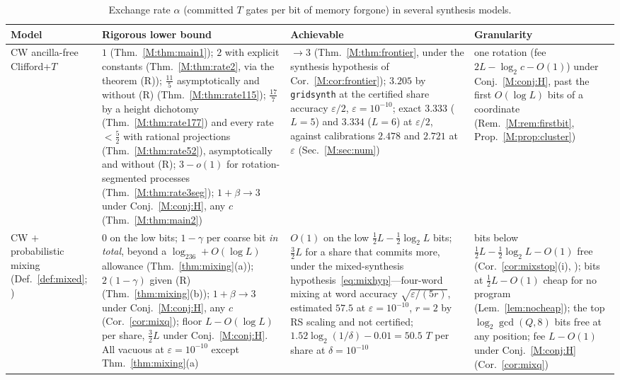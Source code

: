 \documentclass[aps,prx,twocolumn,superscriptaddress,nofootinbib,longbibliography]{revtex4-2}
\theoremstyle{plain}
\theoremstyle{definition}
\theoremstyle{remark}
\begin{document}
\begin{table}[t]
\centering\small
\caption{Exchange rate $\alpha$ (committed $T$ gates per bit of memory forgone) in several synthesis models.}
\label{tab:models}
\begin{tabular}{@{}p{3.6cm} p{5.2cm} p{4.6cm} p{3.4cm}@{}}
\toprule
\raggedright Model & \raggedright Rigorous lower bound & \raggedright Achievable & \raggedright Granularity\tabularnewline
\midrule
\raggedright CW ancilla-free Clifford+$T$ & \raggedright $1$ (Thm.~\ref{M:thm:main1}); $2$ with explicit constants (Thm.~\ref{M:thm:rate2}, via the theorem (R)); $\tfrac{11}5$ asymptotically and without (R) (Thm.~\ref{M:thm:rate115}); $\tfrac{17}7$ by a height dichotomy (Thm.~\ref{M:thm:rate177}) and every rate $<\tfrac52$ with rational projections (Thm.~\ref{M:thm:rate52}), asymptotically and without (R); $3-o(1)$ for rotation-segmented processes (Thm.~\ref{M:thm:rate3seg}); $1+\beta\to3$ under Conj.~\ref{M:conj:H}, any $c$ (Thm.~\ref{M:thm:main2}) & \raggedright $\to3$ (Thm.~\ref{M:thm:frontier}, under the synthesis hypothesis of Cor.~\ref{M:cor:frontier}); $3.205$ by \texttt{gridsynth} at the certified share accuracy $\varepsilon/2$, $\varepsilon=10^{-10}$; exact $3.333$ ($L=5$) and $3.334$ ($L=6$) at $\varepsilon/2$, against calibrations $2.478$ and $2.721$ at $\varepsilon$ (Sec.~\ref{M:sec:num}) & \raggedright one rotation (fee $2L-\log_2c-O(1)$) under Conj.~\ref{M:conj:H}, past the first $O(\log L)$ bits of a coordinate (Rem.~\ref{M:rem:firstbit}, Prop.~\ref{M:prop:cluster})\tabularnewline
\raggedright CW $+$ probabilistic mixing (Def.~\ref{def:mixed}; \cite{Campbell17,Hastings17,KLMPP,Bothe}) & \raggedright $0$ on the low bits; $1-\gamma$ per coarse bit \emph{in total}, beyond a $\log_236+O(\log L)$ allowance (Thm.~\ref{thm:mixing}(a)); $2(1-\gamma)$ given (R) (Thm.~\ref{thm:mixing}(b)); $1+\beta\to3$ under Conj.~\ref{M:conj:H}, any $c$ (Cor.~\ref{cor:mixq}); floor $L-O(\log L)$ per share, $\tfrac32L$ under Conj.~\ref{M:conj:H}. All vacuous at $\varepsilon=10^{-10}$ except Thm.~\ref{thm:mixing}(a) & \raggedright $O(1)$ on the low $\tfrac12L-\tfrac12\log_2L$ bits; $\tfrac32L$ for a share that commits more, under the mixed-synthesis hypothesis~\eqref{eq:mixhyp}---four-word mixing \cite[Thm.~2]{Campbell17} at word accuracy $\sqrt{\varepsilon/(5r)}$, estimated $57.5$ at $\varepsilon=10^{-10}$, $r=2$ by RS scaling and not certified; $1.52\log_2(1/\delta)-0.01=50.5$ $T$ per share at $\delta=10^{-10}$ \cite{KLMPP,Bothe} & \raggedright bits below $\tfrac12L-\tfrac12\log_2L-O(1)$ free (Cor.~\ref{cor:mixstop}(i), \cite{Bothe}); bits at $\tfrac12L-O(1)$ cheap for no program (Lem.~\ref{lem:nocheap}); the top $\log_2\gcd(Q,8)$ bits free at any position; fee $L-O(1)$ under Conj.~\ref{M:conj:H} (Cor.~\ref{cor:mixq})\tabularnewline

\end{tabular}
\end{table}
\end{document}

